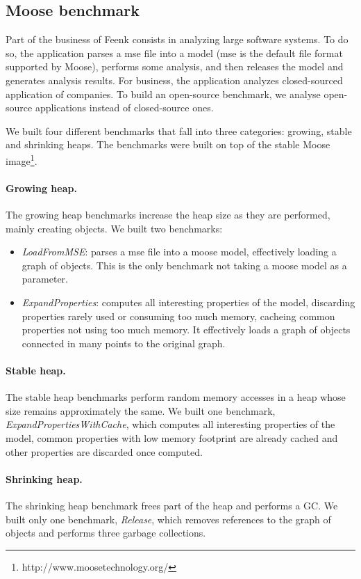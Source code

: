 \documentclass[10pt, sigplan]{acmart}
\begin{document}
\subsection{Moose benchmark} \label{sec:mooseBench}

Part of the business of Feenk consists in analyzing large software systems. To do so, the application parses a mse file into a model (mse is the default file format supported by Moose), performs some analysis, and then releases the model and generates analysis results. For business, the application analyzes closed-sourced application of companies. To build an open-source benchmark, we analyse open-source applications instead of closed-source ones.

We built four different benchmarks that fall into three categories: growing, stable and shrinking heaps. The benchmarks were built on top of the stable Moose image\footnote{http://www.moosetechnology.org/}.

\paragraph{Growing heap.} The growing heap benchmarks increase the heap size as they are performed, mainly creating objects. We built two benchmarks:
\begin{itemize}
	\item \emph{LoadFromMSE}: parses a mse file into a moose model, effectively loading a graph of objects. This is the only benchmark not taking a moose model as a parameter.
	\item \emph{ExpandProperties}: computes all interesting properties of the model, discarding properties rarely used or consuming too much memory, cacheing common properties not using too much memory. It effectively loads a graph of objects connected in many points to the original graph. 
\end{itemize}

\paragraph{Stable heap.} The stable heap benchmarks perform random memory accesses in a heap whose size remains approximately the same. We built one benchmark, \emph{ExpandPropertiesWithCache}, which computes all interesting properties of the model, common properties with low memory footprint are already cached and other properties are discarded once computed.

\paragraph{Shrinking heap.} The shrinking heap benchmark frees part of the heap and performs a GC. We built only one benchmark, \emph{Release}, which removes references to the graph of objects and performs three garbage collections.
\end{document}

